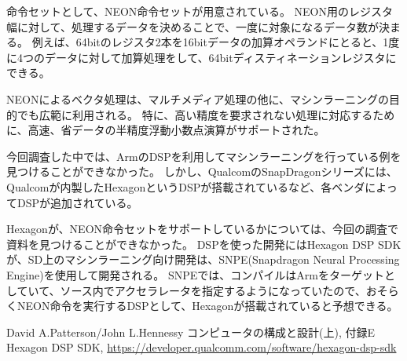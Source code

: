 \documentclass[a4paper,10pt]{jsarticle}
\begin{document}
命令セットとして、NEON命令セットが用意されている。
NEON用のレジスタ幅に対して、処理するデータを決めることで、一度に対象になるデータ数が決まる。
例えば、64bitのレジスタ2本を16bitデータの加算オペランドにとると、1度に4つのデータに対して加算処理をして、64bitディスティネーションレジスタにできる。

NEONによるベクタ処理は、マルチメディア処理の他に、マシンラーニングの目的でも広範に利用される。
特に、高い精度を要求されない処理に対応するために、高速、省データの半精度浮動小数点演算がサポートされた。

今回調査した中では、ArmのDSPを利用してマシンラーニングを行っている例を見つけることができなかった。
しかし、QualcomのSnapDragonシリーズには、Qualcomが内製したHexagonというDSPが搭載されているなど、各ベンダによってDSPが追加されている。

Hexagonが、NEON命令セットをサポートしているかについては、今回の調査で資料を見つけることができなかった。
DSPを使った開発にはHexagon DSP SDKが、SD上のマシンラーニング向け開発は、SNPE(Snapdragon Neural Processing Engine)を使用して開発される。
SNPEでは、コンパイルはArmをターゲットとしていて、ソース内でアクセラレータを指定するようになっていたので、おそらくNEON命令を実行するDSPとして、Hexagonが搭載されていると予想できる。

\begin{thebibliography}{9}
   David A.Patterson/John L.Hennessy コンピュータの構成と設計(上), 付録E
   Hexagon DSP SDK, \url{https://developer.qualcomm.com/software/hexagon-dsp-sdk}
\end{thebibliography}
\end{document}
